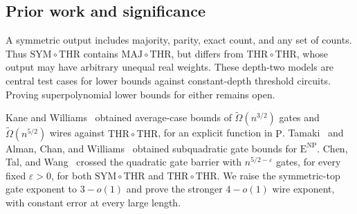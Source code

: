 \documentclass[11pt,letterpaper]{article}
\theoremstyle{definition}
\theoremstyle{remark}
\newcommand{\THR}{\mathrm{THR}}
\newcommand{\SYM}{\mathrm{SYM}}
\newcommand{\ENP}{\mathrm{E}^{\mathrm{NP}}}
\begin{document}
\subsection{Prior work and significance}\label{sec:prior}
A symmetric output includes majority, parity, exact count, and any
set of counts. Thus \(\SYM\circ\THR\) contains
\(\mathrm{MAJ}\circ\THR\), but differs from
\(\THR\circ\THR\), whose output may have arbitrary unequal real
weights. These depth-two models are central test cases for lower
bounds against constant-depth threshold circuits. Proving
superpolynomial lower bounds for either remains open.

Kane and Williams~\cite[Theorem~1.1]{KW16} obtained average-case
bounds of \(\widetilde\Omega(n^{3/2})\) gates and
\(\widetilde\Omega(n^{5/2})\) wires against
\(\THR\circ\THR\), for an explicit function in \(\mathrm P\).
Tamaki~\cite{Tam16} and Alman, Chan, and Williams~\cite{ACW16}
obtained subquadratic gate bounds for \(\ENP\).
Chen, Tal, and Wang~\cite[Theorem~1.1]{CTW26} crossed the quadratic
gate barrier with \(n^{5/2-\varepsilon}\) gates, for every fixed
\(\varepsilon>0\), for both \(\SYM\circ\THR\) and
\(\THR\circ\THR\). We raise the symmetric-top gate exponent
to \(3-o(1)\) and prove the stronger \(4-o(1)\) wire exponent,
with constant error at every large length.
\end{document}
